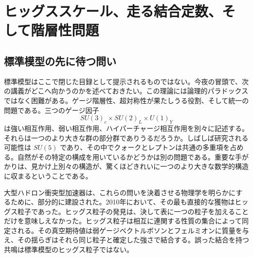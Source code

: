 \chapter{ヒッグススケール、走る結合定数、そして階層性問題}


\section{標準模型の先に待つ問い}

標準模型はここで閉じた目録として提示されるものではない。今夜の冒頭で、次の講義がどこへ向かうのかを述べておきたい。この理論には論理的パラドックスではなく困難がある。ゲージ階層性、超対称性が果たしうる役割、そして統一の問題である。三つのゲージ因子
\begin{equation}
  SU(3)_c\times SU(2)_L\times U(1)_Y
  \label{eq:l10-standard-model-group}
\end{equation}
は強い相互作用、弱い相互作用、ハイパーチャージ相互作用を別々に記述する。それらは一つのより大きな群の部分群でありうるだろうか。しばしば研究される可能性は
\(SU(5)\)
であり、その中でクォークとレプトンは共通の多重項を占める。自然がその特定の構成を用いているかどうかは別の問題である。重要な手がかりは、見かけ上別々の構造が、驚くほどきれいに一つのより大きな数学的構造に収まるということである。

大型ハドロン衝突型加速器は、これらの問いを決着させる物理学を明らかにするために、部分的に建設された。2010年において、その最も直接的な獲物はヒッグス粒子であった。ヒッグス粒子の発見は、決して表に一つの粒子を加えることだけを意味しえなかった。ヒッグス粒子は相互に連関する性質の集合によって同定される。その真空期待値は弱ゲージベクトルボソンとフェルミオンに質量を与え、その揺らぎはそれら同じ粒子と確定した強さで結合する。誤った結合を持つ共鳴は標準模型のヒッグス粒子ではない。

